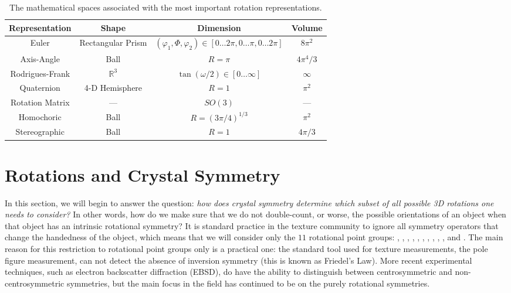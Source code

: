 \begin{table}[h!]
\centering\leavevmode
\begin{tabular}{|c|c|c|c|}
\hline
Representation & Shape & Dimension & Volume \\
\hline\hline
Euler & Rectangular Prism & $(\varphi_1,\Phi,\varphi_2)\in [0\ldots 2\pi,0\ldots\pi,0\ldots2\pi]$& $8\pi^2$\\
Axis-Angle & Ball & $R=\pi$ & $4\pi^4/3$\\
Rodrigues-Frank & $\mathbb{R}^3$ & $\tan(\omega/2)\in[0\ldots\infty]$ & $\infty$\\
Quaternion & 4-D Hemisphere & $R=1$ & $\pi^2$\\
Rotation Matrix & --- & $SO(3)$ & ---\\
Homochoric & Ball & $R=(3\pi/4)^{1/3}$ & $\pi^2$\\
Stereographic & Ball & $R=1$ & $4\pi/3$ \\
\hline
\end{tabular}
\caption{\label{\chabbr:tb:spaces}The mathematical spaces associated with the most important rotation representations.}
\end{table}


\section{Rotations and Crystal Symmetry}\label{\chabbr:sec:rotsym}
In this section, we will begin to answer the question: \textit{how does crystal symmetry determine which subset of all possible 3D rotations one needs to consider?} In other words, how do we make sure that we do not double-count, or worse, the possible orientations of an object when that object has an intrinsic rotational symmetry?  It is standard practice in the texture community to ignore all symmetry operators that change the handedness of the object, which means that we will consider only the $11$ rotational point groups: , , , , , , , , , , and .  The main reason for this restriction to rotational point groups only is a practical one: the standard tool used for texture measurements, the pole figure measurement, can not detect the absence of inversion symmetry (this is known as Friedel's Law).  More recent experimental techniques, such as electron backscatter diffraction (EBSD), do have the ability to distinguish between centrosymmetric and non-centrosymmetric symmetries, but the main focus in the field has continued to be on the purely rotational symmetries.

